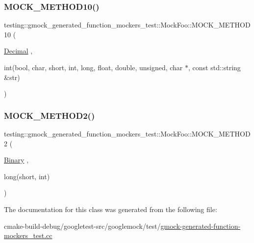 \mbox{\label{classtesting_1_1gmock__generated__function__mockers__test_1_1MockFoo_ab0a37a844eb43c36ca45cff5274bd9e9}} 
\subsubsection{\texorpdfstring{MOCK\_METHOD10()}{MOCK\_METHOD10()}}
{\footnotesize\ttfamily testing\+::gmock\+\_\+generated\+\_\+function\+\_\+mockers\+\_\+test\+::\+Mock\+Foo\+::\+M\+O\+C\+K\+\_\+\+M\+E\+T\+H\+O\+D10 (\begin{DoxyParamCaption}\item[{\mbox{\hyperlink{classtesting_1_1gmock__generated__function__mockers__test_1_1FooInterface_a5a389017205848c7b7055c071cca0c6d}{Decimal}}}]{,  }\item[{int(bool, char, short, int, long, float, double, unsigned, char $\ast$, const std\+::string \&str)}]{ }\end{DoxyParamCaption})}

\mbox{\label{classtesting_1_1gmock__generated__function__mockers__test_1_1MockFoo_a50f8c94d6fab258d49e1d4a15ea7a7af}} 
\subsubsection{\texorpdfstring{MOCK\_METHOD2()}{MOCK\_METHOD2()}}
{\footnotesize\ttfamily testing\+::gmock\+\_\+generated\+\_\+function\+\_\+mockers\+\_\+test\+::\+Mock\+Foo\+::\+M\+O\+C\+K\+\_\+\+M\+E\+T\+H\+O\+D2 (\begin{DoxyParamCaption}\item[{\mbox{\hyperlink{classtesting_1_1gmock__generated__function__mockers__test_1_1FooInterface_a59ea28b711ece054ce9d57c2dc574ba0}{Binary}}}]{,  }\item[{long(short, int)}]{ }\end{DoxyParamCaption})}



The documentation for this class was generated from the following file\+:\begin{DoxyCompactItemize}
\item 
cmake-\/build-\/debug/googletest-\/src/googlemock/test/\mbox{\hyperlink{gmock-generated-function-mockers__test_8cc}{gmock-\/generated-\/function-\/mockers\+\_\+test.\+cc}}\end{DoxyCompactItemize}
